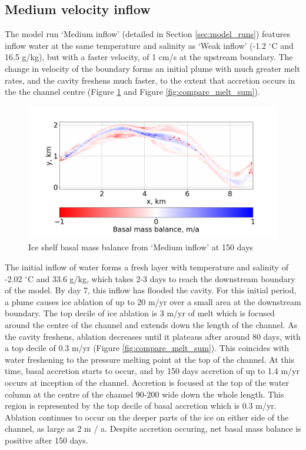 

\subsection{Medium velocity inflow} \label{sec:medium_inflow}

The model run `Medium inflow' (detailed in Section \ref{sec:model_runs}) features inflow water at the same temperature and salinity as `Weak inflow' (-1.2 $^{\circ}$C and 16.5 g/kg), but with a faster velocity, of 1 cm/s at the upstream boundary. The change in velocity of the boundary forms an initial plume with much greater melt rates, and the cavity freshens much faster, to the extent that accretion occurs in the the channel centre (Figure \ref{fig:accretion} and Figure \ref{fig:compare_melt_sum}).

\begin{figure}[!ht]
\centering
\includegraphics[width=1\textwidth]{chapters/4/accretion.png}
\caption[]{Ice shelf basal mass balance from `Medium inflow' at 150 days}
\label{fig:accretion}
\end{figure}

The initial inflow of water forms a fresh layer with temperature and salinity of -2.02 $^{\circ}$C and 33.6  g/kg, which takes 2-3 days to reach the downstream boundary of the model. By day 7, this inflow has flooded the cavity.  
For this initial period, a plume causes ice ablation of up to 20 m/yr over a small area at the downstream boundary. The top decile of ice ablation is 3 m/yr of melt which is focused around the centre of the channel and extends down the length of the channel. As the cavity freshens, ablation decreases until it plateaus after around 80 days, with a top decile of 0.3 m/yr (Figure \ref{fig:compare_melt_sum}). This coincides with water freshening to the pressure melting point at the top of the channel. At this time, basal accretion starts to occur, and by 150 days accretion of up to 1.4 m/yr occurs at inception of the channel. Accretion is focused at the top of the water column at the centre of the channel 90-200 wide down the whole length. This region is represented by the top decile of basal accretion which is 0.3 m/yr. Ablation continues to occur on the deeper parts of the ice on either side of the channel, as large as 2 m / a. Despite accretion occuring, net basal mass balance is positive after 150 days.

